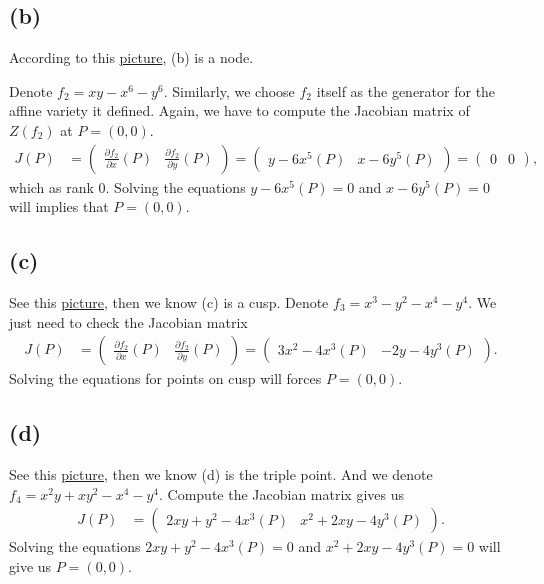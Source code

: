 \subsection{(b)}

According to this \href{https://www.desmos.com/calculator/c298mxdjtn}{picture}, (b) is a node.

Denote $f_2=xy-x^6-y^6$. Similarly, we choose $f_2$ itself as the generator for the affine variety it defined.
Again, we have to compute the Jacobian matrix of $Z(f_2)$ at $P=(0,0)$. 
\begin{align*}
    J(P) &= \begin{pmatrix}
        \frac{\partial f_2}{\partial x}(P) & \frac{\partial f_2}{\partial y}(P)
            \end{pmatrix}
        = \begin{pmatrix}
            y-6x^5 (P) & x-6y^5 (P)
        \end{pmatrix} 
        = \begin{pmatrix}
            0 & 0
        \end{pmatrix},
\end{align*}which as rank $0$. Solving the equations $y-6x^5(P)=0$ and $x-6y^5(P)=0$ will implies that $P=(0,0)$.

\subsection{(c)}

See this \href{https://www.desmos.com/calculator/orh1nqbgng}{picture}, then we know (c) is a cusp.
Denote $f_3=x^3-y^2-x^4-y^4$.
We just need to check the Jacobian matrix 
\begin{align*}
    J(P) &= \begin{pmatrix}
        \frac{\partial f_2}{\partial x}(P) & \frac{\partial f_2}{\partial y}(P)
            \end{pmatrix}
        = \begin{pmatrix}
            3x^2-4x^3(P) & -2y-4y^3 (P)
        \end{pmatrix}.
\end{align*}
Solving the equations for points on cusp will forces $P=(0,0)$.

\subsection{(d)}

See this \href{https://www.desmos.com/calculator/b7gltpeepv}{picture}, then we know (d) is the triple point. And we denote $f_4=x^2y+xy^2-x^4-y^4$.
Compute the Jacobian matrix gives us
\begin{align*}
    J(P) &= \begin{pmatrix}
        2xy+y^2-4x^3 (P) & x^2+2xy-4y^3 (P)
    \end{pmatrix}.
\end{align*}
Solving the equations $2xy+y^2-4x^3 (P)=0 $ and $x^2+2xy-4y^3 (P)=0$ will give us $P=(0,0)$.

